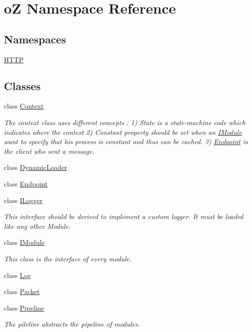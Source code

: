 \hypertarget{namespaceo_z}{}\section{oZ Namespace Reference}
\label{namespaceo_z}
\subsection*{Namespaces}
\begin{DoxyCompactItemize}
\item 
 \mbox{\hyperlink{namespaceo_z_1_1_h_t_t_p}{H\+T\+TP}}
\end{DoxyCompactItemize}
\subsection*{Classes}
\begin{DoxyCompactItemize}
\item 
class \mbox{\hyperlink{classo_z_1_1_context}{Context}}
\begin{DoxyCompactList}\small\item\em The context class uses different concepts \+: 1) State is a state-\/machine code which indicates where the context 2) Constant property should be set when an \mbox{\hyperlink{classo_z_1_1_i_module}{I\+Module}} want to specify that his process is constant and thus can be cached. 3) \mbox{\hyperlink{classo_z_1_1_endpoint}{Endpoint}} is the client who sent a message. \end{DoxyCompactList}\item 
class \mbox{\hyperlink{classo_z_1_1_dynamic_loader}{Dynamic\+Loader}}
\item 
class \mbox{\hyperlink{classo_z_1_1_endpoint}{Endpoint}}
\item 
class \mbox{\hyperlink{classo_z_1_1_i_logger}{I\+Logger}}
\begin{DoxyCompactList}\small\item\em This interface should be derived to implement a custom logger. It must be loaded like any other Module. \end{DoxyCompactList}\item 
class \mbox{\hyperlink{classo_z_1_1_i_module}{I\+Module}}
\begin{DoxyCompactList}\small\item\em This class is the interface of every module. \end{DoxyCompactList}\item 
class \mbox{\hyperlink{classo_z_1_1_log}{Log}}
\item 
class \mbox{\hyperlink{classo_z_1_1_packet}{Packet}}
\item 
class \mbox{\hyperlink{classo_z_1_1_pipeline}{Pipeline}}
\begin{DoxyCompactList}\small\item\em The pileline abstracts the pipeline of modules. \end{DoxyCompactList}\end{DoxyCompactItemize}
